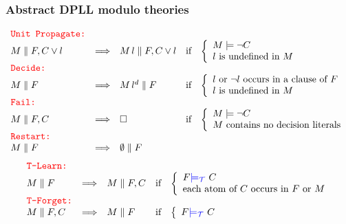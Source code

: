 \documentclass[smaller]{beamer}
\newcommand{\state}[2]{{#1\parallel #2}}
\def\cT{{\cal T}}
\newcommand{\blue}[1]{\textcolor{blue}{#1}}
\newcommand{\red}[1]{\textcolor{red}{#1}}
\begin{document}
\begin{frame}
\frametitle{Abstract DPLL modulo theories}
{\scriptsize
\[
\begin{array}{lclcl}
\red{\mbox{\tt Unit Propagate:}} \\
\state{M}{F,C\vee l}&\Longrightarrow& \state{M\,l}{F,C\vee l} &\mbox{if} &\left\{\begin{array}{l}
														      M\models \neg C\\
														      \mbox{$l$ is undefined in $M$}																	      \end{array}\right. \\[1mm]
\red{\mbox{\tt Decide:}} \\
\state{M}{F}&\Longrightarrow& \state{M\,l^d}{F} &\mbox{if} &\left\{\begin{array}{l}
												\mbox{$l$ or $\neg l$ occurs in a clause of $F$}\\
												\mbox{$l$ is undefined in $M$}
												\end{array}\right. \\[1mm]
\red{\mbox{\tt Fail:}} \\
\state{M}{F,C}&\Longrightarrow& \Box &\mbox{if} &\left\{\begin{array}{l}
											M\models \neg C\\
											\mbox{$M$ contains no decision literals}															        \end{array}\right. \\[1mm]
\red{\mbox{\tt Restart:}} \\
\state{M}{F}&\Longrightarrow& \state{\emptyset}{F}  
\end{array}
\]}
{\small
\[
\begin{array}{lclcl}
\red{\mbox{\tt T-Learn:}} \\
\state{M}{F}&\Longrightarrow& \state{M}{F,C} &\mbox{if} &\left\{\begin{array}{l}
												F\blue{\models_\cT}\ C\\
												\mbox{each atom of $C$ occurs in $F$ or $M$}															\end{array}\right. \\[2mm]
\red{\mbox{\tt T-Forget:}} \\
\state{M}{F,C}&\Longrightarrow& \state{M}{F} &\mbox{if} &\left\{\begin{array}{l}
												F\blue{\models_\cT}\ C\\
												\end{array}\right. \\[2mm]

\end{array}\]}
\end{frame}
\end{document}
